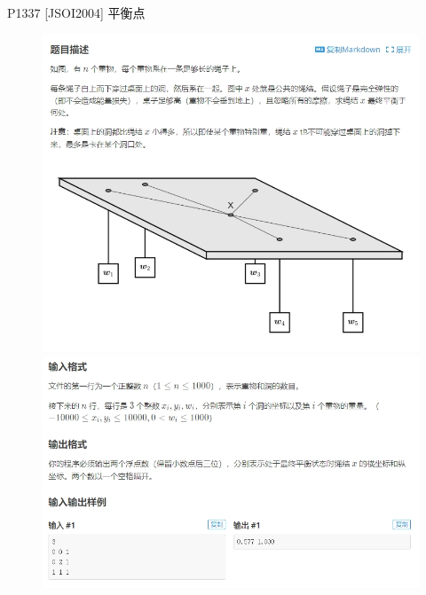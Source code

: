 \documentclass{beamer}
\begin{document}
\begin{frame}{P1337 [JSOI2004] 平衡点}
    \small
    \begin{figure}[H]
        \centering
        \begin{minipage}[t]{0.49\textwidth}
            \centering
            \includegraphics[width=\textwidth]{pic/p1337_1.png}
        \end{minipage}
        \hfill
        \begin{minipage}[t]{0.49\textwidth}
            \centering
            \includegraphics[width=\textwidth]{pic/p1337_2.png}
        \end{minipage}
    \end{figure}
\end{frame}
\end{document}

